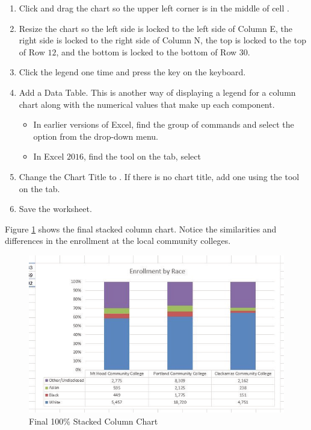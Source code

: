\begin{enumerate}[resume]
	\item Click and drag the chart so the upper left corner is in the middle of cell .
	\item Resize the chart so the left side is locked to the left side of Column E, the right side is locked to the right side of Column N, the top is locked to the top of Row $ 12 $, and the bottom is locked to the bottom of Row $ 30 $.
	\item Click the legend one time and press the  key on the keyboard.
	\item Add a Data Table. This is another way of displaying a legend for a column chart along with the numerical values that make up each component.

	\begin{itemize}
		\item In earlier versions of Excel, find the  group of commands and select the  option from the drop-down menu.
		\item In Excel $ 2016 $, find the  tool on the  tab, select 
	\end{itemize}

	\item Change the Chart Title to . If there is no chart title, add one using the  tool on the  tab.
	\item Save the worksheet.
\end{enumerate}

Figure \ref{04:fig26} shows the final stacked column chart. Notice the similarities and differences in the enrollment at the local community colleges.

\begin{figure}[H]
	\centering
	\includegraphics[width=\maxwidth{.95\linewidth}]{gfx/ch04_fig26}
	\caption{Final 100\% Stacked Column Chart}
	\label{04:fig26}
\end{figure}

